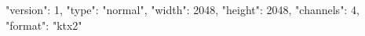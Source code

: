 {
  "version": 1,
  "type": "normal",
  "width": 2048,
  "height": 2048,
  "channels": 4,
  "format": "ktx2"
}
